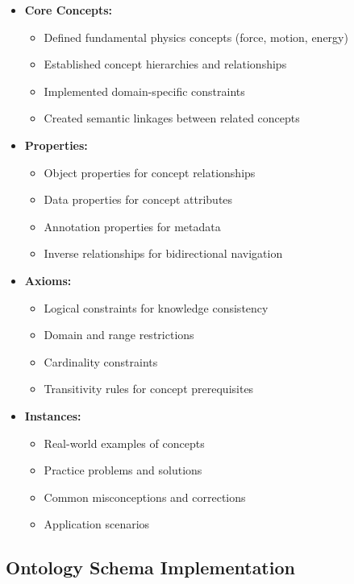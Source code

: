 \begin{itemize}
  \item \textbf{Core Concepts:} 
    \begin{itemize}
      \item Defined fundamental physics concepts (force, motion, energy)
      \item Established concept hierarchies and relationships
      \item Implemented domain-specific constraints
      \item Created semantic linkages between related concepts
    \end{itemize}
  
  \item \textbf{Properties:} 
    \begin{itemize}
      \item Object properties for concept relationships
      \item Data properties for concept attributes
      \item Annotation properties for metadata
      \item Inverse relationships for bidirectional navigation
    \end{itemize}
  
  \item \textbf{Axioms:} 
    \begin{itemize}
      \item Logical constraints for knowledge consistency
      \item Domain and range restrictions
      \item Cardinality constraints
      \item Transitivity rules for concept prerequisites
    \end{itemize}
  
  \item \textbf{Instances:} 
    \begin{itemize}
      \item Real-world examples of concepts
      \item Practice problems and solutions
      \item Common misconceptions and corrections
      \item Application scenarios
    \end{itemize}
\end{itemize}

\subsection{Ontology Schema Implementation}
\label{subsec:ontology-schema}

